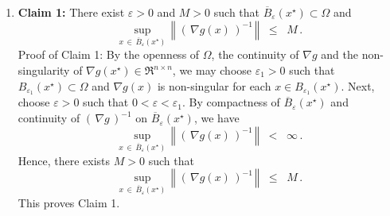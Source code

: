 \begin{enumerate}
\item
	\textbf{Claim 1:}\quad
	There exist $\varepsilon > 0$ and $M > 0$ such that
	$\overline{B}_{\varepsilon}(x^{\star}) \subset \Omega$ and
	\begin{equation*}
	\underset{x\,\in\,\overline{B}_{\varepsilon}(x^{\star})}{\sup}\,
	\left\Vert\;\left(\,\nabla g(x)\,\right)^{-1}\,\right\Vert
	\;\; \leq \;\; M\,.
	\end{equation*}
	Proof of Claim 1:\quad
	By the openness of $\Omega$, the continuity of $\nabla g$ and
	the non-singularity of $\nabla g(x^{\star}) \in \Re^{n \times n}$,
	we may choose $\varepsilon_{1} > 0$ such that
	$B_{\varepsilon_{1}}\!(x^{\star}) \subset \Omega$
	and $\nabla g(x)$ is non-singular for each $x \in B_{\varepsilon_{1}}\!(x^{\star})$.
	Next, choose $\varepsilon > 0$ such that $0 < \varepsilon < \varepsilon_{1}$.
	By compactness of $\overline{B}_{\varepsilon}(x^{\star})$ and continuity of
	$(\,\nabla g\,)^{-1}$ on $\overline{B}_{\varepsilon}(x^{\star})$, we have
	\begin{equation*}
	\underset{x\,\in\,\overline{B}_{\varepsilon}(x^{\star})}{\sup}\,
	\left\Vert\;\left(\,\nabla g(x)\,\right)^{-1}\,\right\Vert
	\;\; < \;\; \infty\,.
	\end{equation*}
	Hence, there exists $M > 0$ such that
	\begin{equation*}
	\underset{x\,\in\,\overline{B}_{\varepsilon}(x^{\star})}{\sup}\,
	\left\Vert\;\left(\,\nabla g(x)\,\right)^{-1}\,\right\Vert
	\;\; \leq \;\; M\,.
	\end{equation*}
	This proves Claim 1.
	

\end{enumerate}
